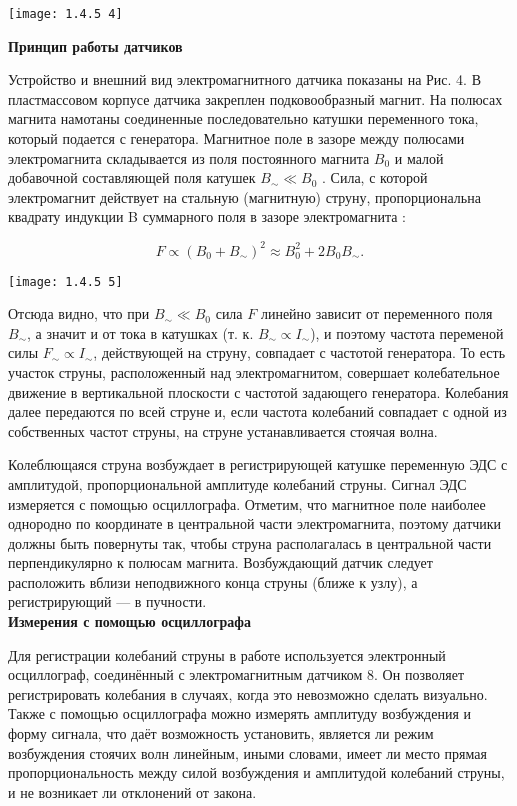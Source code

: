 \documentclass[a4paper,12pt]{article} %
\begin{document}
\texttt{[image: 1.4.5 4]}

{\bf Принцип работы датчиков}

Устройство и внешний вид электромагнитного датчика показаны на Рис. 4.
В пластмассовом корпусе датчика закреплен подковообразный магнит. На полюсах
магнита намотаны соединенные последовательно катушки переменного тока, который подается с генератора. Магнитное
поле в зазоре между полюсами электромагнита складывается из поля постоянного
магнита $B_0$ и малой добавочной составляющей поля катушек $B_{\sim} \ll B_0$ . Сила, с которой электромагнит действует на стальную
(магнитную) струну, пропорциональна
квадрату индукции B суммарного поля в
зазоре электромагнита :

\[ F\propto (B_0+ B_{\sim})^2 \approx B_0^2 + 2B_0B_{\sim} .\]

\begin{center}
\texttt{[image: 1.4.5 5]}
\end{center}

Отсюда видно, что при $B_{\sim} \ll B_0$ сила $F$ линейно зависит от переменного
поля $B_{\sim}$, а значит и от тока в катушках (т. к. $B_{\sim}  \propto I_{\sim}$), и поэтому частота переменой силы $ F_{\sim} \propto I_{\sim}$, действующей на струну, совпадает с частотой генератора. То есть участок струны, расположенный над электромагнитом, совершает колебательное движение в вертикальной плоскости с частотой задающего генератора. Колебания далее передаются по всей струне и,
если частота колебаний совпадает с одной из собственных частот струны, на
струне устанавливается стоячая волна. 

Колеблющаяся струна возбуждает в
регистрирующей катушке переменную ЭДС с амплитудой, пропорциональной амплитуде колебаний струны. Сигнал ЭДС измеряется с помощью осциллографа.
Отметим, что магнитное поле наиболее однородно по координате в центральной части электромагнита, поэтому датчики должны быть повернуты
так, чтобы струна располагалась в центральной части перпендикулярно к полюсам магнита. Возбуждающий датчик следует расположить вблизи неподвижного конца струны (ближе к узлу), а регистрирующий — в пучности.\\

{\bf Измерения с помощью осциллографа}

Для регистрации колебаний струны в работе используется электронный
осциллограф, соединённый с электромагнитным датчиком 8. Он позволяет
регистрировать колебания в случаях, когда это невозможно сделать визуально. Также с помощью осциллографа можно измерять амплитуду возбуждения и форму сигнала, что даёт возможность установить, является ли режим
возбуждения стоячих волн линейным, иными словами, имеет ли место прямая пропорциональность между силой возбуждения и амплитудой колебаний
струны, и не возникает ли отклонений от закона. 
\end{document}

